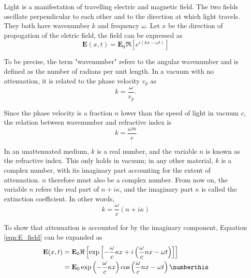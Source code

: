 Light is a manifestation of travelling electric and magnetic field. The two fields oscillate perpendicular to each other and to the direction at which light travels. They both have
wavenumber $k$ and frequency $\omega$. Let $x$ be the direction of propogation of the eletric field, the field can be expressed as
\begin{equation}
    \mathbf{E}(x,t) = \mathbf{E}_0 \Re \left[ {e^{i (kx - \omega t)}} \right]
    \label{eqn:E_field}
\end{equation}

To be precise, the term "wavenumber" refers to the angular wavenumber and is defined as the number of radians per unit length. In a vacuum with no attenuation, it is related to the phase velocity $v_p$ as
\begin{equation}
    k = \frac{\omega}{v_p}.
\end{equation}

Since the phase velocity is a fraction $n$ lower than the speed of light in vacuum $c$, the relation between wavenumber and refractive index is
\begin{equation}
    k = \frac{\omega n}{c}
\end{equation}

In an unattenuated medium, $k$ is a real number, and the variable $n$ is known as the refractive index. This only holds in vacuum; in any other material, $k$ is a complex number, with its imaginary part accounting
for the extent of attenuation. $n$ therefore must also be a complex number. From now on, the variable $n$ refers the real part of $n + i\kappa$, and the imaginary part $\kappa$ is called the extinction coefficient.
In other words,
\begin{equation}
    k = \frac{\omega}{c} (n+i\kappa)
\end{equation}

To show that attenuation is accounted for by the imaginary component, Equation \ref{eqn:E_field} can be expanded as
\begin{align*}
    \mathbf{E}(x,t) &= \mathbf{E}_0 \Re \left[ \exp \left[-\frac{\omega}{c}\kappa x + i\left(\frac{\omega}{c}nx - \omega t \right) \right] \right] \\
    &= \mathbf{E}_0 \exp \left(-\frac{\omega}{c}\kappa x\right) \cos\left( \frac{\omega}{c}nx - \omega t \right) \numberthis
\end{align*}

